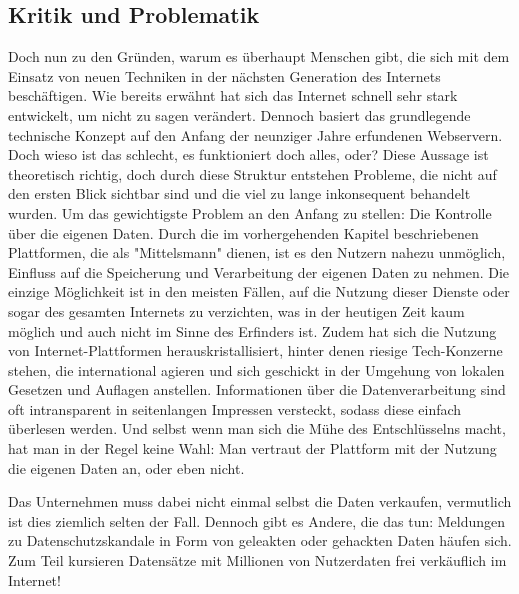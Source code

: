 


\subsection{Kritik und Problematik}

Doch nun zu den Gründen, warum es überhaupt Menschen gibt, die sich mit dem Einsatz von neuen Techniken in der nächsten Generation des Internets beschäftigen. Wie bereits erwähnt hat sich das Internet schnell sehr stark entwickelt, um nicht zu sagen verändert. Dennoch basiert das grundlegende technische Konzept auf den Anfang der neunziger Jahre erfundenen Webservern. Doch wieso ist das schlecht, es funktioniert doch alles, oder? 
Diese Aussage ist theoretisch richtig, doch durch diese Struktur entstehen Probleme, die nicht auf den ersten Blick sichtbar sind und die viel zu lange inkonsequent behandelt wurden. Um das gewichtigste Problem an den Anfang zu stellen: Die Kontrolle über die eigenen Daten. Durch die im vorhergehenden Kapitel beschriebenen Plattformen, die als "Mittelsmann" dienen, ist es den Nutzern nahezu unmöglich, Einfluss auf die Speicherung und Verarbeitung der eigenen Daten zu nehmen. Die einzige Möglichkeit ist in den meisten Fällen, auf die Nutzung dieser Dienste oder sogar des gesamten Internets zu verzichten, was in der heutigen Zeit kaum möglich und auch nicht im Sinne des Erfinders ist.
Zudem hat sich die Nutzung von Internet-Plattformen herauskristallisiert, hinter denen riesige Tech-Konzerne stehen, die international agieren und sich geschickt in der Umgehung von lokalen Gesetzen und Auflagen anstellen. Informationen über die Datenverarbeitung sind oft intransparent in seitenlangen Impressen versteckt, sodass diese einfach überlesen werden. Und selbst wenn man sich die Mühe des Entschlüsselns macht, hat man in der Regel keine Wahl: Man vertraut der Plattform mit der Nutzung die eigenen Daten an, oder eben nicht.

Das Unternehmen muss dabei nicht einmal selbst die Daten verkaufen, vermutlich ist dies ziemlich selten der Fall. Dennoch gibt es Andere, die das tun: Meldungen zu Datenschutzskandale in Form von geleakten oder gehackten Daten häufen sich. Zum Teil kursieren Datensätze mit Millionen von Nutzerdaten frei verkäuflich im Internet!

